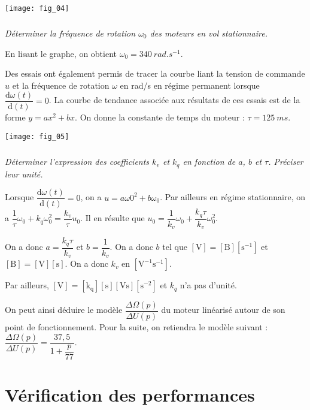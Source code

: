 \begin{multicols}{2}
\begin{center}
\texttt{[image: fig\_04]}
\end{center}

\subparagraph{}\textit{Déterminer la fréquence de rotation $\omega_0$ des
moteurs en vol stationnaire.}
\ifprof
\begin{corrige}
En lisant le graphe, on obtient $\omega_0=\SI{340}{rad.s^{-1}}$.
\end{corrige}
\else
\fi



Des essais ont également permis de tracer la
courbe liant la tension de commande $u$ et la
fréquence de rotation $\omega$ en rad/s en régime
permanent lorsque $\dfrac{\text{d}\omega(t)}{\text{d}(t)}=0$. La courbe de tendance associée aux résultats de
ces essais est de la forme $y=ax^2+bx$. On donne la constante de temps du moteur :
$\tau=\SI{125}{ms}$.

\begin{center}
\texttt{[image: fig\_05]}
\end{center}

\subparagraph{}\textit{Déterminer l'expression des coefficients $k_v$ et $k_q$ en fonction de $a$, $b$ et $\tau$. Préciser leur unité.}
\ifprof
\begin{corrige}
Lorsque $\dfrac{\text{d}\omega(t)}{\text{d}(t)}=0$, on a  $u=a\omega0^2+b\omega_0$. Par ailleurs en régime stationnaire, on a $\dfrac{1}{\tau}\omega_0 +k_q\omega_0^2 = \dfrac{k_v}{\tau}u_0$. Il en résulte que 
$u_0 = \dfrac{1}{k_v}\omega_0 +\dfrac{k_q\tau}{k_v} \omega_0^2$.

On a donc $a=\dfrac{k_q\tau}{k_v}$ et  $b=\dfrac{1}{k_v}$. On a donc $b$ tel que $[\text{V}]=[\text{B}][\text{s}^{-1}]$ et $[\text{B}]=[\text{V}][\text{s}]$. On a donc $k_v$ en $[\text{V}^{-1}\text{s}^{-1}]$.

Par ailleurs, $[\text{V}]=[\text{k}_{\text{q}}][\text{s}][\text{Vs}][\text{s}^{-2}]$  et $k_q$ n'a pas d'unité. 

\end{corrige}
\else
\fi

On peut ainsi déduire le modèle $\dfrac{\Delta \Omega(p)}{\Delta U(p)}$ du moteur linéarisé autour de son point de fonctionnement. Pour la suite, on retiendra le modèle suivant : $\dfrac{\Delta \Omega(p)}{\Delta U(p)}=\dfrac{37,5}{1+\dfrac{p}{77}}$.

\section*{Vérification des performances}


\end{multicols}
